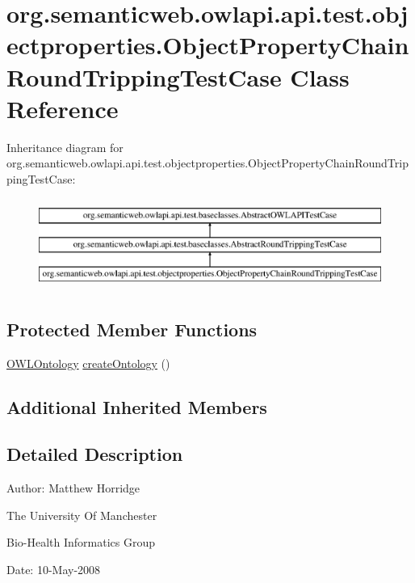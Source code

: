 \hypertarget{classorg_1_1semanticweb_1_1owlapi_1_1api_1_1test_1_1objectproperties_1_1_object_property_chain_round_tripping_test_case}{\section{org.\-semanticweb.\-owlapi.\-api.\-test.\-objectproperties.\-Object\-Property\-Chain\-Round\-Tripping\-Test\-Case Class Reference}
\label{classorg_1_1semanticweb_1_1owlapi_1_1api_1_1test_1_1objectproperties_1_1_object_property_chain_round_tripping_test_case}
}
Inheritance diagram for org.\-semanticweb.\-owlapi.\-api.\-test.\-objectproperties.\-Object\-Property\-Chain\-Round\-Tripping\-Test\-Case\-:\begin{figure}[H]
\begin{center}
\leavevmode
\includegraphics[height=3.000000cm]{classorg_1_1semanticweb_1_1owlapi_1_1api_1_1test_1_1objectproperties_1_1_object_property_chain_round_tripping_test_case}
\end{center}
\end{figure}
\subsection*{Protected Member Functions}
\begin{DoxyCompactItemize}
\item 
\hyperlink{interfaceorg_1_1semanticweb_1_1owlapi_1_1model_1_1_o_w_l_ontology}{O\-W\-L\-Ontology} \hyperlink{classorg_1_1semanticweb_1_1owlapi_1_1api_1_1test_1_1objectproperties_1_1_object_property_chain_round_tripping_test_case_a50af1e3d7f642141bb79a3e35d98a7ec}{create\-Ontology} ()
\end{DoxyCompactItemize}
\subsection*{Additional Inherited Members}


\subsection{Detailed Description}
Author\-: Matthew Horridge\par
 The University Of Manchester\par
 Bio-\/\-Health Informatics Group\par
 Date\-: 10-\/\-May-\/2008\par
 \par
 


